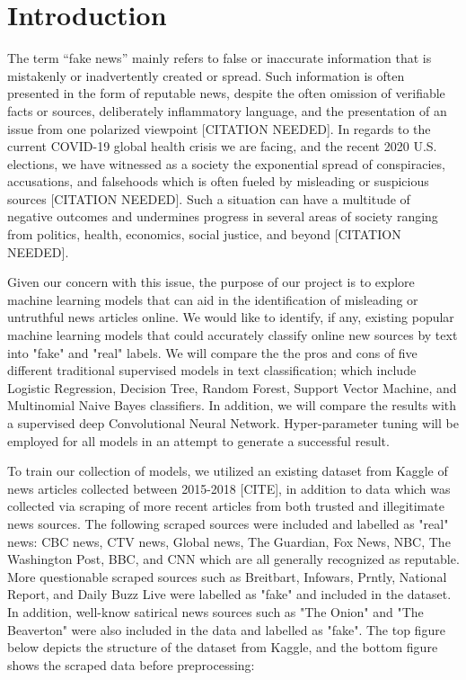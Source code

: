 \documentclass[10pt,twocolumn,letterpaper]{article}
\begin{document}
\section{Introduction}
The term “fake news” mainly refers to false or inaccurate information that is mistakenly or inadvertently created or spread. Such information is often presented in the form of reputable news, despite the often omission of verifiable facts or sources, deliberately inflammatory language, and the presentation of an issue from one polarized viewpoint [CITATION NEEDED]. In regards to the current COVID-19 global health crisis we are facing, and the recent 2020 U.S. elections, we have witnessed as a society the exponential spread of conspiracies, accusations, and falsehoods which is often fueled by misleading or suspicious sources [CITATION NEEDED]. Such a situation can have a multitude of negative outcomes and undermines progress in several areas of society ranging from politics, health, economics, social justice, and beyond [CITATION NEEDED].\par
Given our concern with this issue, the purpose of our project is to explore machine learning models that can aid in the identification of misleading or untruthful news articles online. We would like to identify, if any, existing popular machine learning models that could accurately classify online new sources by text into "fake" and "real" labels. We will compare the the pros and cons of five different traditional supervised models in text classification; which include Logistic Regression, Decision Tree, Random Forest, Support Vector Machine, and Multinomial Naive Bayes classifiers. In addition, we will compare the results with a supervised deep Convolutional Neural Network. Hyper-parameter tuning will be employed for all models in an attempt to generate a successful result.\par
To train our collection of models, we utilized an existing dataset from Kaggle of news articles collected between 2015-2018 [CITE], in addition to data which was collected via scraping of more recent articles from both trusted and illegitimate news sources. The following scraped sources were included and labelled as "real" news: CBC news, CTV news, Global news, The Guardian, Fox News, NBC, The Washington Post, BBC, and CNN which are all generally recognized as reputable. More questionable scraped sources such as Breitbart, Infowars, Prntly, National Report, and Daily Buzz Live were labelled as "fake" and included in the dataset. In addition, well-know satirical news sources such as "The Onion" and "The Beaverton" were also included in the data and labelled as "fake".  The top figure below depicts the structure of the dataset from Kaggle, and the bottom figure shows the scraped data before preprocessing:
\end{document}
